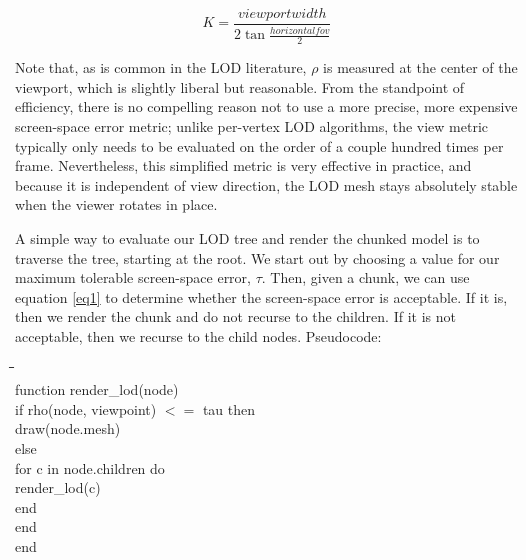 \documentclass[12pt]{article}
\begin{document}
\begin{equation}
K = \frac{ viewportwidth }{ 2 \tan \frac{horizontalfov}{2} }
\label{eq3}
\end{equation}
 
Note that, as is common in the LOD literature, $\rho$ is measured at
the center of the viewport, which is slightly liberal but reasonable.
From the standpoint of efficiency, there is no compelling reason not
to use a more precise, more expensive screen-space error metric;
unlike per-vertex LOD algorithms, the view metric typically only needs
to be evaluated on the order of a couple hundred times per frame.
Nevertheless, this simplified metric is very effective in practice,
and because it is independent of view direction, the LOD mesh stays
absolutely stable when the viewer rotates in place.
 
A simple way to evaluate our LOD tree and render the chunked model is
to traverse the tree, starting at the root.  We start out by choosing
a value for our maximum tolerable screen-space error, $\tau$.
Then, given a chunk, we can use equation \ref{eq1} to determine whether the
screen-space error is acceptable.  If it is, then we render the chunk
and do not recurse to the children.  If it is not acceptable, then we
recurse to the child nodes.  Pseudocode:


\begin{ttfamily}
\begin{tabbing}
\hspace{0.25in}\=\hspace{0.25in}\=\hspace{0.25in}\=\hspace{0.25in}\=\hspace{0.25in}\= \\
function render\_lod(node)                                                      \\
\>      if rho(node, viewpoint) $<=$ tau then                   \\
\>\>            draw(node.mesh)                                                 \\
\>      else                                                                    \\
\>\>            for c in node.children do                                       \\
\>\>\>                  render\_lod(c)                                          \\
\>\>            end                                                             \\
\>      end                                                                     \\
end                                                                             \\
\end{tabbing}
\end{ttfamily}
\end{document}
